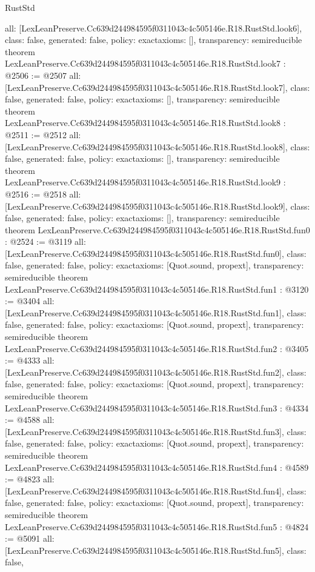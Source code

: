 \begin{lexlean}{RustStd}
\begin{coremodule}
{  all: [LexLeanPreserve.Cc639d244984595f0311043c4c505146e.R18.RustStd.look6],
  class: false,
  generated: false,
  policy: exact{axioms: []},
  transparency: semireducible
}
theorem LexLeanPreserve.Cc639d244984595f0311043c4c505146e.R18.RustStd.look7 : @2506 := @2507 {
  all: [LexLeanPreserve.Cc639d244984595f0311043c4c505146e.R18.RustStd.look7],
  class: false,
  generated: false,
  policy: exact{axioms: []},
  transparency: semireducible
}
theorem LexLeanPreserve.Cc639d244984595f0311043c4c505146e.R18.RustStd.look8 : @2511 := @2512 {
  all: [LexLeanPreserve.Cc639d244984595f0311043c4c505146e.R18.RustStd.look8],
  class: false,
  generated: false,
  policy: exact{axioms: []},
  transparency: semireducible
}
theorem LexLeanPreserve.Cc639d244984595f0311043c4c505146e.R18.RustStd.look9 : @2516 := @2518 {
  all: [LexLeanPreserve.Cc639d244984595f0311043c4c505146e.R18.RustStd.look9],
  class: false,
  generated: false,
  policy: exact{axioms: []},
  transparency: semireducible
}
theorem LexLeanPreserve.Cc639d244984595f0311043c4c505146e.R18.RustStd.fun0 : @2524 := @3119 {
  all: [LexLeanPreserve.Cc639d244984595f0311043c4c505146e.R18.RustStd.fun0],
  class: false,
  generated: false,
  policy: exact{axioms: [Quot.sound, propext]},
  transparency: semireducible
}
theorem LexLeanPreserve.Cc639d244984595f0311043c4c505146e.R18.RustStd.fun1 : @3120 := @3404 {
  all: [LexLeanPreserve.Cc639d244984595f0311043c4c505146e.R18.RustStd.fun1],
  class: false,
  generated: false,
  policy: exact{axioms: [Quot.sound, propext]},
  transparency: semireducible
}
theorem LexLeanPreserve.Cc639d244984595f0311043c4c505146e.R18.RustStd.fun2 : @3405 := @4333 {
  all: [LexLeanPreserve.Cc639d244984595f0311043c4c505146e.R18.RustStd.fun2],
  class: false,
  generated: false,
  policy: exact{axioms: [Quot.sound, propext]},
  transparency: semireducible
}
theorem LexLeanPreserve.Cc639d244984595f0311043c4c505146e.R18.RustStd.fun3 : @4334 := @4588 {
  all: [LexLeanPreserve.Cc639d244984595f0311043c4c505146e.R18.RustStd.fun3],
  class: false,
  generated: false,
  policy: exact{axioms: [Quot.sound, propext]},
  transparency: semireducible
}
theorem LexLeanPreserve.Cc639d244984595f0311043c4c505146e.R18.RustStd.fun4 : @4589 := @4823 {
  all: [LexLeanPreserve.Cc639d244984595f0311043c4c505146e.R18.RustStd.fun4],
  class: false,
  generated: false,
  policy: exact{axioms: [Quot.sound, propext]},
  transparency: semireducible
}
theorem LexLeanPreserve.Cc639d244984595f0311043c4c505146e.R18.RustStd.fun5 : @4824 := @5091 {
  all: [LexLeanPreserve.Cc639d244984595f0311043c4c505146e.R18.RustStd.fun5],
  class: false,
}
\end{coremodule}
\end{lexlean}
